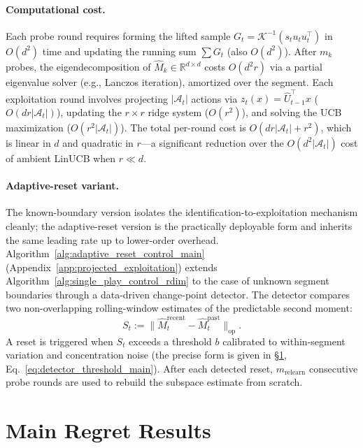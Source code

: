 \documentclass{article}
\newcommand{\R}{\mathbb{R}}
\newcommand{\op}{\mathrm{op}}
\newcommand{\cA}{\mathcal{A}}
\begin{document}
\paragraph{Computational cost.}
Each probe round requires forming the lifted sample $G_t = \mathcal{K}^{-1}(s_t u_t u_t^\top)$ in $O(d^2)$ time and updating the running sum $\sum G_t$ (also $O(d^2)$). After $m_k$ probes, the eigendecomposition of $\widehat{M}_k \in \R^{d \times d}$ costs $O(d^2 r)$ via a partial eigenvalue solver (e.g., Lanczos iteration), amortized over the segment. Each exploitation round involves projecting $|\cA_t|$ actions via $z_t(x) = \widehat{U}_{t-1}^\top x$ ($O(dr|\cA_t|)$), updating the $r \times r$ ridge system ($O(r^2)$), and solving the UCB maximization ($O(r^2 |\cA_t|)$). The total per-round cost is $O(dr|\cA_t| + r^2)$, which is linear in $d$ and quadratic in $r$---a significant reduction over the $O(d^2|\cA_t|)$ cost of ambient LinUCB when $r \ll d$.



\paragraph{Adaptive-reset variant.}
The known-boundary version isolates the identification-to-exploitation mechanism cleanly; the adaptive-reset version is the practically deployable form and inherits the same leading rate up to lower-order overhead.
Algorithm~\ref{alg:adaptive_reset_control_main} (Appendix~\ref{app:projected_exploitation}) extends Algorithm~\ref{alg:single_play_control_rdim} to the case of unknown segment boundaries through a data-driven change-point detector.
The detector compares two non-overlapping rolling-window estimates of the predictable second moment:
\begin{equation}
S_t := \|\widehat M_t^{\mathrm{recent}} - \widehat M_t^{\mathrm{past}}\|_{\op}.
\label{eq:detector_stat}
\end{equation}
A reset is triggered when $S_t$ exceeds a threshold $b$ calibrated to within-segment variation and concentration noise (the precise form is given in \S\ref{sec:theory}, Eq.~\eqref{eq:detector_threshold_main}).
After each detected reset, $m_{\mathrm{relearn}}$ consecutive probe rounds are used to rebuild the subspace estimate from scratch.
\section{Main Regret Results}
\label{sec:theory}
\end{document}
